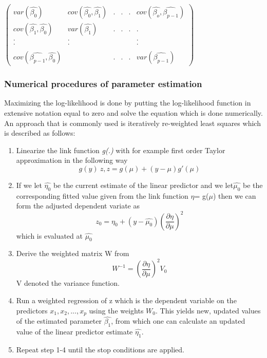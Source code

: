 $ \begin{pmatrix}
	var(\hat{\beta_{0}}) & cov(\hat{\beta_{0}},\hat{\beta_{1}}) & . & . & . & cov(\hat{\beta_{o}},\hat{\beta_{p-1}}) \\
	cov(\hat{\beta_{1}},\hat{\beta_{0}}) & var(\hat{\beta_{1}}) & . & . & . & . \\
	. & . &  &  &  & . \\
	. & . &  &  &  & . \\
	&  &  &  &  &  \\
	cov(\hat{\beta_{p-1}},\hat{\beta_{0}}) & & . & . & . & var(\hat{\beta_{p-1}}) 
\end{pmatrix}  $
\subsubsection{Numerical procedures of parameter estimation}
Maximizing the log-likelihood is done by putting the log-likelihood function in extensive notation equal to zero and solve the equation which is done numerically. An approach that is 
commonly used is iteratively re-weighted least squares \cite{mccullagh2019generalized} which is described as follows:
\begin{enumerate}
	\item Linearize the link function \textit{g(.)} with for example first order Taylor approximation in the following way
	\begin{equation}
		g(y) ~z, z = g(\mu) + (y-\mu) g'(\mu)
	\end{equation}
	\item If we let $\hat{\eta_{0}}$ be the current estimate of the linear predictor and we let$\hat{\mu_{0}}$ be the corresponding fitted value given from the link function $\eta$= g($\mu$) then we can form the adjusted dependent variate as 
	\begin{equation}
		z_{0} = \eta_{0} + (y-\hat{\mu_{0}})(\frac{\partial \eta}{\partial \mu})^{2}
	\end{equation}
	which is evaluated at $\hat{\mu_{0}}$
	\item Derive the weighted matrix W from
	\begin{equation}
		W^{-1} = (\frac{\partial \eta}{\partial \mu})^{2} V_{0}
	\end{equation}
	V denoted the variance function.
	\item Run a weighted regression of z which is the dependent variable on the predictors $x_{1},x_{2},...,x_{p}$ using the weights $W_{0}$. This yields new, updated values of the estimated parameter $\hat{\beta_{1}}$, from which one can calculate an updated value of the linear predictor estimate $\hat{\eta_{1}}$.
	\item Repeat step 1-4 until the stop conditions are applied.
\end{enumerate}
